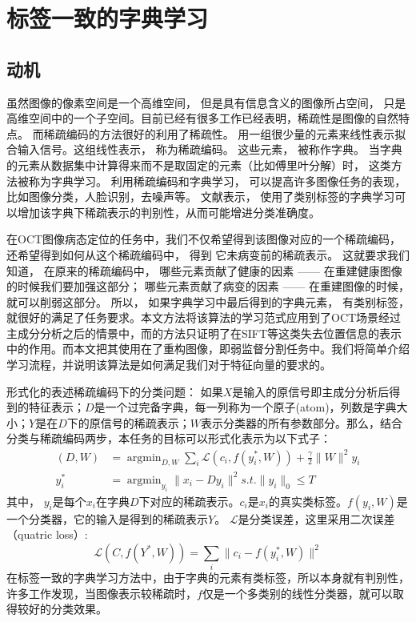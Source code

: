\section{标签一致的字典学习}
\label{sec:lc-ksvd}
    \subsection{动机}
    虽然图像的像素空间是一个高维空间， 但是具有信息含义的图像所占空间， 只是高维空间中的一个子空间。目前已经有很多工作\cite{huang2006sparse,rodriguez2008sparse,yang2010metaface,dong2013nonlocally,afzali2016medical}已经表明，稀疏性是图像的自然特点。 而稀疏编码的方法很好的利用了稀疏性。 用一组很少量的元素来线性表示拟合输入信号。这组线性表示， 称为稀疏编码。 这些元素， 被称作字典。 当字典的元素从数据集中计算得来而不是取固定的元素（比如傅里叶分解）时， 这类方法被称为字典学习。  利用稀疏编码和字典学习， 可以提高许多图像任务的表现，比如图像分类\cite{lazebnik2006beyond,gao2010kernel}，人脸识别\cite{zhang2010discriminative,wright2009robust}，去噪声\cite{elad2006image, dong2013nonlocally, dong2014learning}等。  文献表示， 使用了类别标签的字典学习可以增加该字典下稀疏表示的判别性，从而可能增进分类准确度。

    在OCT图像病态定位的任务中，我们不仅希望得到该图像对应的一个稀疏编码， 还希望得到如何从这个稀疏编码中， 得到 它未病变前的稀疏表示。 这就要求我们 知道， 在原来的稀疏编码中， 哪些元素贡献了健康的因素 —— 在重建健康图像的时候我们要加强这部分； 哪些元素贡献了病变的因素 —— 在重建图像的时候， 就可以削弱这部分。  所以， 如果字典学习中最后得到的字典元素， 有类别标签\cite{jiang2013label}， 就很好的满足了任务要求。本文方法将该算法的学习范式应用到了OCT场景经过主成分分析之后的情景中，而的方法只证明了在SIFT等这类失去位置信息的表示中的作用。而本文把其使用在了重构图像，即弱监督分割任务中。我们将简单介绍学习流程，并说明该算法是如何满足我们对于特征向量的要求的。

    形式化的表述稀疏编码下的分类问题：    
    如果$X$是输入的原信号即主成分分析后得到的特征表示；$D$是一个过完备字典，每一列称为一个原子(atom)，列数是字典大小；$Y$是在$D$下的原信号的稀疏表示；$W$表示分类器的所有参数部分。那么，结合分类与稀疏编码两步，本任务的目标可以形式化表示为以下式子\cite{jiang2013label}：
    \begin{align}
        (D, W) & = \mathop{\arg \min}_{D, W} \sum_i \mathcal{L} (c_i, f(y_i^*, W)) + \frac{\gamma}{2}\|W\| ^2
        y_i \\
        y_i^* & = \mathop{\arg \min}_{y_i} \|x_i - Dy_i\| ^2 s.t. \|y_i\|_0 \le T \label{alg:line:ksvd-over2}
    \end{align}
    其中， $y_i$是每个$x_i$在字典$D$下对应的稀疏表示。$c_i$是$x_i$的真实类标签。$f(y_i, W)$是一个分类器，它的输入是得到的稀疏表示$Y$。 $\mathcal{L}$是分类误差，这里采用二次误差（quatric loss）:
    \begin{equation}
        \mathcal{L}(C, f(Y^*, W)) = \sum _i \|c_i - f(y_i^* , W) \| ^2 
    \end{equation}
    在标签一致的字典学习方法中，由于字典的元素有类标签，所以本身就有判别性，许多工作\cite{jiang2013label,yang2009linear}发现，当图像表示较稀疏时，$f$仅是一个多类别的线性分类器，就可以取得较好的分类效果。

